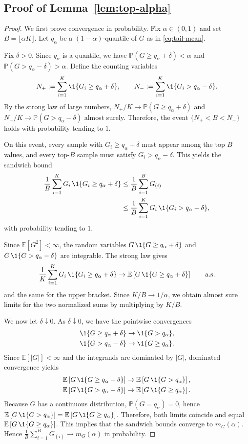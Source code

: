 \documentclass[twocolumn]{scholar7}
\newcommand{\E}{\mathbb{E}}
\newcommand{\Prob}{\mathbb{P}}
\newcommand{\abs}[1]{\left|#1\right|}
\newcommand{\bracks}[1]{\left[#1\right]}
\begin{document}
\begin{appendix}
\subsection{Proof of Lemma~\ref{lem:top-alpha}}
\begin{proof}
We first prove convergence in probability.
Fix $\alpha\in(0,1)$ and set $B=\lfloor \alpha K\rfloor$.
Let $q_\alpha$ be a $(1-\alpha)$-quantile of $G$ as in \eqref{eq:tail-mean}.

Fix $\delta>0$.
Since $q_\alpha$ is a quantile, we have $\Prob(G\ge q_\alpha+\delta)<\alpha$ and $\Prob(G>q_\alpha-\delta)>\alpha$.
Define the counting variables
\[
N_+ := \sum_{i=1}^K \1\{G_i\ge q_\alpha+\delta\},
\qquad
N_- := \sum_{i=1}^K \1\{G_i> q_\alpha-\delta\}.
\]
By the strong law of large numbers, $N_+/K\to \Prob(G\ge q_\alpha+\delta)$ and $N_-/K\to \Prob(G>q_\alpha-\delta)$ almost surely.
Therefore, the event $\{N_+<B<N_-\}$ holds with probability tending to $1$.

On this event, every sample with $G_i\ge q_\alpha+\delta$ must appear among the top $B$ values, and every top-$B$ sample must satisfy $G_i>q_\alpha-\delta$.
This yields the sandwich bound
\begin{align*}
\frac{1}{B}\sum_{i=1}^K G_i\,\1\{G_i\ge q_\alpha+\delta\}
&\le
\frac{1}{B}\sum_{i=1}^B G_{(i)} \\
&\le
\frac{1}{B}\sum_{i=1}^K G_i\,\1\{G_i> q_\alpha-\delta\},
\end{align*}
with probability tending to $1$.

Since $\E[G^2]<\infty$, the random variables $G\,\1\{G\ge q_\alpha+\delta\}$ and $G\,\1\{G> q_\alpha-\delta\}$ are integrable.
The strong law gives
\[
\frac{1}{K}\sum_{i=1}^K G_i\,\1\{G_i\ge q_\alpha+\delta\}
\to
\E\bracks{G\,\1\{G\ge q_\alpha+\delta\}}
\qquad\text{a.s.}
\]
and the same for the upper bracket.
Since $K/B\to 1/\alpha$, we obtain almost sure limits for the two normalized sums by multiplying by $K/B$.

We now let $\delta\downarrow 0$.
As $\delta\downarrow 0$, we have the pointwise convergences
\begin{align*}
\1\{G\ge q_\alpha+\delta\} & \to \1\{G>q_\alpha\}, \\
\1\{G>q_\alpha-\delta\}    & \to \1\{G\ge q_\alpha\}.
\end{align*}
Since $\E[\abs{G}]<\infty$ and the integrands are dominated by $\abs{G}$, dominated convergence yields
\begin{align*}
\E\bracks{G\,\1\{G\ge q_\alpha+\delta\}} & \to \E\bracks{G\,\1\{G>q_\alpha\}}, \\
\E\bracks{G\,\1\{G>q_\alpha-\delta\}} & \to \E\bracks{G\,\1\{G\ge q_\alpha\}}.
\end{align*}
Because $G$ has a continuous distribution, $\Prob(G=q_\alpha)=0$, hence
$\E\bracks{G\,\1\{G>q_\alpha\}}=\E\bracks{G\,\1\{G\ge q_\alpha\}}$.
Therefore, both limits coincide and equal $\E\bracks{G\,\1\{G\ge q_\alpha\}}$.
This implies that the sandwich bounds converge to $m_G(\alpha)$.
Hence $\frac{1}{B}\sum_{i=1}^B G_{(i)}\to m_G(\alpha)$ in probability.


\end{proof}
\end{appendix}
\end{document}
